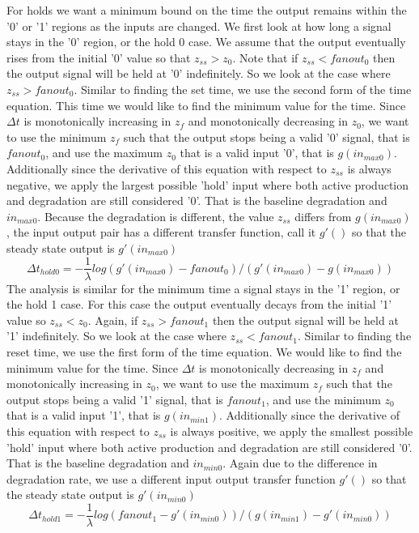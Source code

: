 \documentclass{article}
\begin{document}
For holds we want a minimum bound on the time the output remains within the '0' or '1' regions as the inputs are changed.  We first look at how long a signal stays in the '0' region, or the hold 0 case.  We assume that the output eventually rises from the initial '0' value so that $z_{ss}>z_0$.  Note that if $z_{ss}<fanout_0$ then the output signal will be held at '0' indefinitely.  So we look at the case where $z_{ss}>fanout_0$.  Similar to finding the set time, we use the second form of the time equation.  This time we would like to find the minimum value for the time.  Since $\Delta t$ is monotonically increasing in $z_f$ and monotonically decreasing in $z_0$, we want to use the minimum $z_f$ such that the output stops being a valid '0' signal, that is $fanout_0$, and use the maximum $z_0$ that is a valid input '0', that is $g(in_{max0})$.  Additionally since the derivative of this equation with respect to $z_{ss}$ is always negative, we apply the largest possible 'hold' input where both active production and degradation are still considered '0'.  That is the baseline degradation and $in_{max0}$.  Because the degradation is different, the value $z_{ss}$ differs from $g(in_{max0})$, the input output pair has a different transfer function, call it $g'()$ so that the steady state output is $g'(in_{max0})$
\[\Delta t_{hold0}= -\frac{1}{\lambda} log(g'(in_{max0}) -fanout_0)/(g'(in_{max0}) -g(in_{max0}))				
\]
The analysis is similar for the minimum time a signal stays in the '1' region, or the hold 1 case.  For this case the output eventually decays from the initial '1' value so $z_{ss}<z_0$. Again, if $z_{ss}>fanout_1$ then the output signal will be held at '1' indefinitely. So we look at the case where $z_{ss}<fanout_1$.  Similar to finding the reset time, we use the first form of the time equation.   We would like to find the minimum value for the time.  Since $\Delta t$ is monotonically decreasing in $z_f$ and monotonically increasing in $z_0$, we want to use the maximum $z_f$ such that the output stops being a valid '1' signal, that is $fanout_1$, and use the minimum $z_0$ that is a valid input '1', that is $g(in_{min1})$.  Additionally since the derivative of this equation with respect to $z_{ss}$ is always positive, we apply the smallest possible 'hold' input where both active production and degradation are still considered '0'.  That is the baseline degradation and $in_{min0}$.  Again due to the difference in degradation rate, we use a different input output transfer function $g'()$ so that the steady state output is $g'(in_{min0})$  
\[\Delta t_{hold1}= -\frac{1}{\lambda} log(fanout_1 -g'(in_{min0}))/(g(in_{min1}) -g'(in_{min0}))
\]
\end{document}
